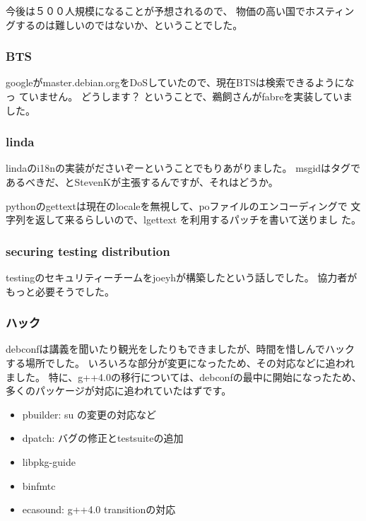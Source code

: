 \documentclass[mingoth]{jsarticle}
\begin{document}
今後は５００人規模になることが予想されるので、
物価の高い国でホスティングするのは難しいのではないか、ということでした。


\subsubsection{BTS}

googleがmaster.debian.orgをDoSしていたので、現在BTSは検索できるようになっ
ていません。
どうします？
ということで、鵜飼さんがfabreを実装していました。

\subsubsection{linda}

lindaのi18nの実装がださいぞーということでもりあがりました。
msgidはタグであるべきだ、とStevenKが主張するんですが、それはどうか。

pythonのgettextは現在のlocaleを無視して、poファイルのエンコーディングで
文字列を返して来るらしいので、lgettext を利用するパッチを書いて送りまし
た。

\subsubsection{securing testing distribution}

testingのセキュリティーチームをjoeyhが構築したという話しでした。
協力者がもっと必要そうでした。

\subsubsection{ハック}

debconfは講義を聞いたり観光をしたりもできましたが、時間を惜しんでハックする場所でした。
いろいろな部分が変更になったため、その対応などに追われました。
特に、g++4.0の移行については、debconfの最中に開始になったため、
多くのパッケージが対応に追われていたはずです。

\begin{itemize}
 \item pbuilder: su の変更の対応など
 \item dpatch: バグの修正とtestsuiteの追加
 \item libpkg-guide
 \item binfmtc
 \item ecasound: g++4.0 transitionの対応
\end{itemize}
\end{document}
